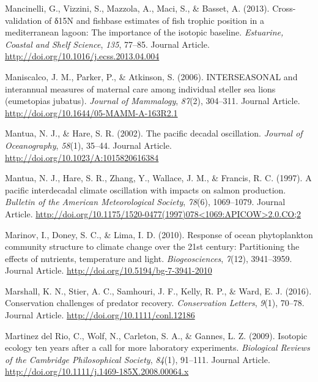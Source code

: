 \documentclass [11pt, proquest] {uwthesis}[2015/03/03]
\begin{document}
\hypertarget{ref-Mancinelli2013}{}
Mancinelli, G., Vizzini, S., Mazzola, A., Maci, S., \& Basset, A.
(2013). Cross-validation of δ15N and fishbase estimates of fish trophic
position in a mediterranean lagoon: The importance of the isotopic
baseline. \emph{Estuarine, Coastal and Shelf Science}, \emph{135},
77--85. Journal Article. \url{http://doi.org/10.1016/j.ecss.2013.04.004}

\hypertarget{ref-Maniscalco2006}{}
Maniscalco, J. M., Parker, P., \& Atkinson, S. (2006). INTERSEASONAL and
interannual measures of maternal care among individual steller sea lions
(eumetopias jubatus). \emph{Journal of Mammalogy}, \emph{87}(2),
304--311. Journal Article.
\url{http://doi.org/10.1644/05-MAMM-A-163R2.1}

\hypertarget{ref-Mantua2002}{}
Mantua, N. J., \& Hare, S. R. (2002). The pacific decadal oscillation.
\emph{Journal of Oceanography}, \emph{58}(1), 35--44. Journal Article.
\url{http://doi.org/10.1023/A:1015820616384}

\hypertarget{ref-Mantua1997}{}
Mantua, N. J., Hare, S. R., Zhang, Y., Wallace, J. M., \& Francis, R. C.
(1997). A pacific interdecadal climate oscillation with impacts on
salmon production. \emph{Bulletin of the American Meteorological
Society}, \emph{78}(6), 1069--1079. Journal Article.
\href{http://doi.org/10.1175/1520-0477(1997)078\%3C1069:APICOW\%3E2.0.CO;2}{http://doi.org/10.1175/1520-0477(1997)078\textless{}1069:APICOW\textgreater{}2.0.CO;2}

\hypertarget{ref-Marinov2010}{}
Marinov, I., Doney, S. C., \& Lima, I. D. (2010). Response of ocean
phytoplankton community structure to climate change over the 21st
century: Partitioning the effects of nutrients, temperature and light.
\emph{Biogeosciences}, \emph{7}(12), 3941--3959. Journal Article.
\url{http://doi.org/10.5194/bg-7-3941-2010}

\hypertarget{ref-Marshall2016}{}
Marshall, K. N., Stier, A. C., Samhouri, J. F., Kelly, R. P., \& Ward,
E. J. (2016). Conservation challenges of predator recovery.
\emph{Conservation Letters}, \emph{9}(1), 70--78. Journal Article.
\url{http://doi.org/10.1111/conl.12186}

\hypertarget{ref-DelRio2009}{}
Martinez del Rio, C., Wolf, N., Carleton, S. A., \& Gannes, L. Z.
(2009). Isotopic ecology ten years after a call for more laboratory
experiments. \emph{Biological Reviews of the Cambridge Philosophical
Society}, \emph{84}(1), 91--111. Journal Article.
\url{http://doi.org/10.1111/j.1469-185X.2008.00064.x}
\end{document}
